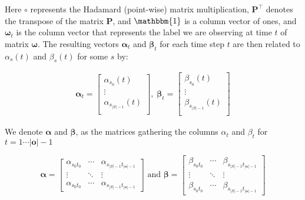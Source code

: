 Here $\circ$ represents the Hadamard (point-wise) matrix multiplication, $\pmb{P}^\top$ denotes the transpose of the matrix $\pmb{P}$, and $\mathbbm{1}$ is a column vector of ones, and $\pmb{\omega}_t$ is the column vector that represents the label we are observing at time $t$ of matrix $\pmb{\omega}$.
The resulting vectors $\pmb{\alpha}_t$ and $\pmb{\beta}_t$ for each time step $t$ are then related to $\alpha_s(t)$ and $\beta_s(t)$ for some $s$ by:

\begin{align}
\pmb{\alpha}
    _t = \begin{bmatrix}
             \alpha_{s_0}(t)       \\
             \vdots                \\
             \alpha_{s_{|S|-1}}(t) \\
    \end{bmatrix}, \;
    \pmb{\beta}_t = \begin{bmatrix}
                    \beta_{s_0}(t)       \\
                    \vdots               \\
                    \beta_{s_{|S|-1}}(t) \\
    \end{bmatrix}
\end{align}

We denote $\pmb{\alpha}$ and $\pmb{\beta}$, as the matrices gathering the 
columns $\alpha_t$ and $\beta_t$ for $t = 1\cdots |\mathbf{o}|-1$

\begin{equation}
    \pmb{\alpha} = 
        \begin{bmatrix}
            \alpha_{s_0 t_{0}}  & \cdots & \alpha_{s_{|S|-1}t_{|\textbf{o}|-1}} \\
            \vdots               & \ddots & \vdots                      \\
            \alpha_{s_0 t_{0}}  & \cdots & \alpha_{s_{|S|-1}t_{|\textbf{o}|-1}}
        \end{bmatrix}
        \text{ and }
    \pmb{\beta} = 
        \begin{bmatrix}
            \beta_{s_0 t_{0}}  & \cdots & \beta_{s_{|S|-1}t_{|\textbf{o}|-1}} \\
            \vdots               & \ddots & \vdots                      \\
            \beta_{s_0 t_{0}}  & \cdots & \beta_{s_{|S|-1}t_{|\textbf{o}|-1}}
        \end{bmatrix}\label{eq:forward-backward-matrix}
\end{equation}

